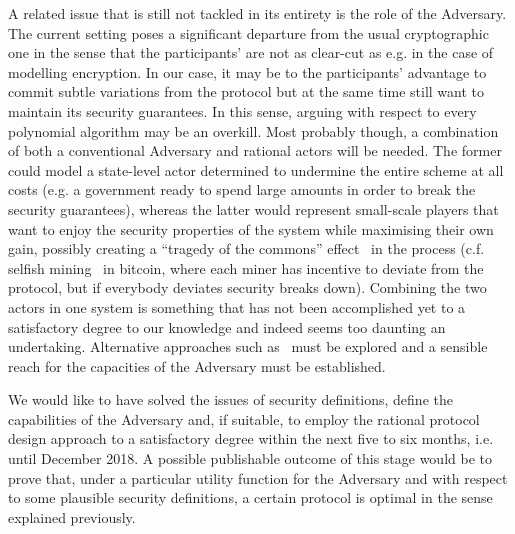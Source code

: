   A related issue that is still not tackled in its entirety is the role of the Adversary.
  The current setting poses a significant departure from the usual cryptographic one in
  the sense that the participants' are not as clear-cut as e.g. in the case of modelling
  encryption. In our case, it may be to the participants' advantage to commit subtle
  variations from the protocol but at the same time still want to maintain its security
  guarantees. In this sense, arguing with respect to every polynomial algorithm may be an
  overkill. Most probably though, a combination of both a conventional Adversary and
  rational actors will be needed. The former could model a state-level actor determined to
  undermine the entire scheme at all costs (e.g. a government ready to spend large amounts
  in order to break the security guarantees), whereas the latter would represent
  small-scale players that want to enjoy the security properties of the system while
  maximising their own gain, possibly creating a ``tragedy of the commons''
  effect~\cite{tragedy} in the process (c.f. selfish mining~\cite{selfishmine} in bitcoin,
  where each miner has incentive to deviate from the protocol, but if everybody deviates
  security breaks down). Combining the two actors in one system is something that has not
  been accomplished yet to a satisfactory degree to our knowledge and indeed seems too
  daunting an undertaking.  Alternative approaches such as~\cite{rationalprotocol} must be
  explored and a sensible reach for the capacities of the Adversary must be established.

  We would like to have solved the issues of security definitions, define the capabilities
  of the Adversary and, if suitable, to employ the rational protocol design approach to a
  satisfactory degree within the next five to six months, i.e. until December 2018. A
  possible publishable outcome of this stage would be to prove that, under a particular
  utility function for the Adversary and with respect to some plausible security
  definitions, a certain protocol is optimal in the sense explained previously.
